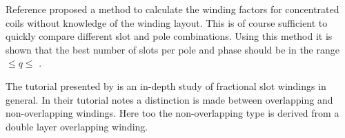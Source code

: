 Reference \cite{REF-00756} proposed a method to calculate the winding factors for concentrated coils without knowledge of the winding layout. This is of course sufficient to quickly compare different slot and pole combinations. Using this method it is shown that the best number of slots per pole and phase should be in the range \textonequarter $\leq q\leq$ \textonehalf. 

The tutorial presented by \cite{REF-01056} is an in-depth study of fractional slot windings in general. In their tutorial notes a distinction is made between overlapping and non-overlapping windings. Here too the non-overlapping type is derived from a double layer overlapping winding. 